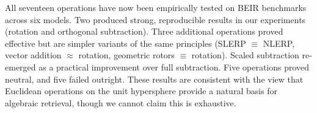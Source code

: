 \documentclass{article}
\begin{document}
All seventeen operations have now been empirically tested on BEIR benchmarks across six models. Two produced strong, reproducible results in our experiments (rotation and orthogonal subtraction). Three additional operations proved effective but are simpler variants of the same principles (SLERP $\equiv$ NLERP, vector addition $\approx$ rotation, geometric rotors $\equiv$ rotation). Scaled subtraction re-emerged as a practical improvement over full subtraction. Five operations proved neutral, and five failed outright. These results are consistent with the view that Euclidean operations on the unit hypersphere provide a natural basis for algebraic retrieval, though we cannot claim this is exhaustive.
\end{document}
